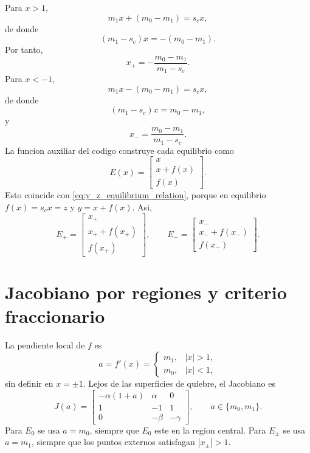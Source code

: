 \documentclass[11pt]{article}
\begin{document}
Para \(x>1\),
\[
m_1x+(m_0-m_1)=s_cx,
\]
de donde
\[
(m_1-s_c)x=-(m_0-m_1).
\]
Por tanto,
\begin{equation}
\label{eq:xplus}
x_+=-\frac{m_0-m_1}{m_1-s_c}.
\end{equation}
Para \(x<-1\),
\[
m_1x-(m_0-m_1)=s_cx,
\]
de donde
\[
(m_1-s_c)x=m_0-m_1,
\]
y
\begin{equation}
\label{eq:xminus}
x_-=\frac{m_0-m_1}{m_1-s_c}.
\end{equation}
La funcion auxiliar del codigo construye cada equilibrio como
\[
E(x)=
\begin{bmatrix}
x\\
x+f(x)\\
f(x)
\end{bmatrix}.
\]
Esto coincide con \eqref{eq:y_z_equilibrium_relation}, porque en equilibrio
\(f(x)=s_cx=z\) y \(y=x+f(x)\). Asi,
\begin{equation}
\label{eq:Epm}
E_+=
\begin{bmatrix}
x_+\\
x_+ + f(x_+)\\
f(x_+)
\end{bmatrix},
\qquad
E_-=
\begin{bmatrix}
x_-\\
x_- + f(x_-)\\
f(x_-)
\end{bmatrix}.
\end{equation}

\section{Jacobiano por regiones y criterio fraccionario}

La pendiente local de \(f\) es
\[
a=f'(x)=
\begin{cases}
m_1, & |x|>1,\\
m_0, & |x|<1,
\end{cases}
\]
sin definir en \(x=\pm1\). Lejos de las superficies de quiebre, el Jacobiano es
\begin{equation}
\label{eq:jacobian_region}
J(a)=
\begin{bmatrix}
-\alpha(1+a) & \alpha & 0\\
1 & -1 & 1\\
0 & -\beta & -\gamma
\end{bmatrix},
\qquad a\in\{m_0,m_1\}.
\end{equation}
Para \(E_0\) se usa \(a=m_0\), siempre que \(E_0\) este en la region central.
Para \(E_\pm\) se usa \(a=m_1\), siempre que los puntos externos satisfagan
\(|x_\pm|>1\).
\end{document}
